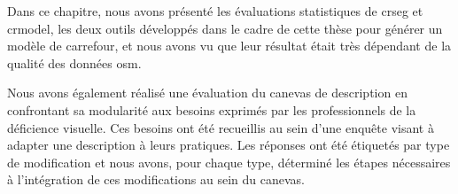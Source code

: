 Dans ce chapitre, nous avons présenté les évaluations statistiques de crseg et crmodel, les deux outils développés dans le cadre de cette thèse pour générer un modèle de carrefour,  et nous avons vu que leur résultat était très dépendant de la qualité des données \gls{osm}. 

\newpar{}

Nous avons également réalisé une évaluation du canevas de description en confrontant sa modularité aux besoins exprimés par les professionnels de la déficience visuelle. Ces besoins ont été recueillis au sein d'une enquête visant à adapter une description à leurs pratiques. Les réponses ont été étiquetés par type de modification et nous avons, pour chaque type, déterminé les étapes nécessaires à l'intégration de ces modifications au sein du canevas.